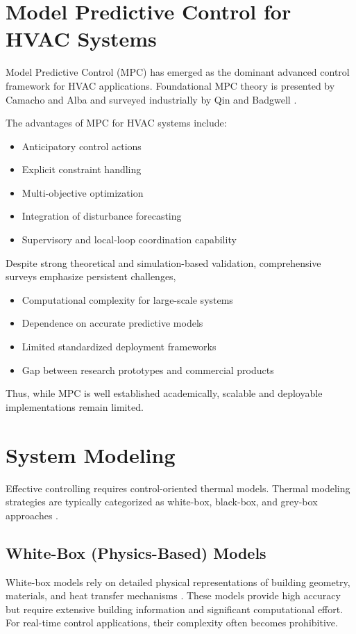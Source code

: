 \documentclass[twocolumn,11pt,a4paper]{article}
\begin{document}
\section{Model Predictive Control for HVAC Systems}
Model Predictive Control (MPC) has emerged as the dominant advanced control framework for HVAC applications. Foundational MPC theory is presented by Camacho and Alba \cite{camachoModelPredictiveControl2007} and surveyed industrially by Qin and Badgwell \cite{qinSurveyIndustrialModel2003}. 

The advantages of MPC for HVAC systems include:
\begin{itemize}
    \item Anticipatory control actions
    \item Explicit constraint handling
    \item Multi-objective optimization
    \item Integration of disturbance forecasting
    \item Supervisory and local-loop coordination capability \cite{aframTheoryApplicationsHVAC2014}
\end{itemize}

Despite strong theoretical and simulation-based validation, comprehensive surveys emphasize persistent challenges,
\begin{itemize}
    \item Computational complexity for large-scale systems
    \item Dependence on accurate predictive models
    \item Limited standardized deployment frameworks
    \item Gap between research prototypes and commercial products \cite{aframTheoryApplicationsHVAC2014}
\end{itemize}

Thus, while MPC is well established academically, scalable and deployable implementations remain limited.

\section{System Modeling}
Effective controlling requires control-oriented thermal models. Thermal modeling strategies are typically categorized as white-box, black-box, and grey-box approaches \cite{aframTheoryApplicationsHVAC2014}.

\subsection{White-Box (Physics-Based) Models}
White-box models rely on detailed physical representations of building geometry, materials, and heat transfer mechanisms \cite{aframTheoryApplicationsHVAC2014}. These models provide high accuracy but require extensive building information and significant computational effort. For real-time control applications, their complexity often becomes prohibitive.
\end{document}
